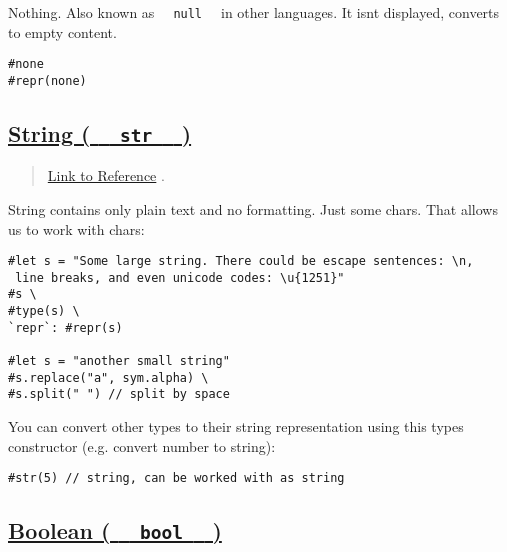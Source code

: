 Nothing. Also known as \texttt{\ }{\texttt{\ null\ }}\texttt{\ } in
other languages. It isn\textquotesingle t displayed, converts to empty
content.

\begin{verbatim}
#none
#repr(none)
\end{verbatim}

\pandocbounded{}

\subsection{\texorpdfstring{\hyperref[string-str]{String (
\texttt{\ }{\texttt{\ str\ }}\texttt{\ }
)}}{String (   str   )}}\label{string-str}

\begin{quote}
\href{https://typst.app/docs/reference/foundations/str/}{Link to
Reference} .
\end{quote}

String contains only plain text and no formatting. Just some chars. That
allows us to work with chars:

\begin{verbatim}
#let s = "Some large string. There could be escape sentences: \n,
 line breaks, and even unicode codes: \u{1251}"
#s \
#type(s) \
`repr`: #repr(s)

#let s = "another small string"
#s.replace("a", sym.alpha) \
#s.split(" ") // split by space
\end{verbatim}

\pandocbounded{}

You can convert other types to their string representation using this
type\textquotesingle s constructor (e.g. convert number to string):

\begin{verbatim}
#str(5) // string, can be worked with as string
\end{verbatim}

\pandocbounded{}

\subsection{\texorpdfstring{\hyperref[boolean-bool]{Boolean (
\texttt{\ }{\texttt{\ bool\ }}\texttt{\ }
)}}{Boolean (   bool   )}}\label{boolean-bool}

